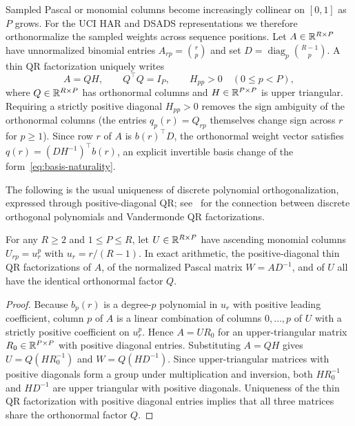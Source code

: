 Sampled Pascal or monomial columns become increasingly collinear on \([0,1]\) as
\(P\) grows. For the UCI HAR and DSADS representations we therefore orthonormalize
the sampled weights across sequence positions. Let \(A \in \mathbb{R}^{R \times P}\) have
unnormalized binomial entries \(A_{rp} = \binom{r}{p}\) and set
\(D = \operatorname{diag}_p\binom{R-1}{p}\). A thin QR factorization uniquely
writes
\[
 A = Q H, \qquad Q^\top Q = I_P, \qquad H_{pp} > 0 \quad (0 \leq p < P),
\]
where \(Q \in \mathbb{R}^{R \times P}\) has orthonormal columns and \(H \in \mathbb{R}^{P \times P}\)
is upper triangular. Requiring a strictly positive diagonal \(H_{pp} > 0\)
removes the sign ambiguity of the orthonormal columns (the entries
\(q_p(r) = Q_{rp}\) themselves change sign across \(r\) for \(p \geq 1\)). Since
row \(r\) of \(A\) is \(b(r)^\top D\), the orthonormal weight vector satisfies
\(q(r) = (D H^{-1})^\top b(r)\), an explicit invertible basis change of the
form~\eqref{eq:basis-naturality}.

The following is the usual uniqueness of discrete polynomial orthogonalization,
expressed through positive-diagonal QR; see~\cite{discreteqr} for the connection
between discrete orthogonal polynomials and Vandermonde QR factorizations.
\begin{proposition}
\label{prop:qr-uniqueness}
For any \(R \geq 2\) and \(1 \leq P \leq R\), let \(U \in \mathbb{R}^{R \times P}\) have
ascending monomial columns \(U_{rp} = u_r^p\) with \(u_r = r/(R-1)\). In exact
arithmetic, the positive-diagonal thin QR factorizations of \(A\), of the
normalized Pascal matrix \(W = A D^{-1}\), and of \(U\) all have the identical
orthonormal factor \(Q\).
\end{proposition}
\begin{proof}
Because \(b_p(r)\) is a degree-\(p\) polynomial in \(u_r\) with positive leading
coefficient, column \(p\) of \(A\) is a linear combination of columns
\(0, \ldots, p\) of \(U\) with a strictly positive coefficient on \(u_r^p\).
Hence \(A = U R_0\) for an upper-triangular matrix \(R_0 \in \mathbb{R}^{P \times P}\)
with positive diagonal entries. Substituting \(A = Q H\) gives
\(U = Q (H R_0^{-1})\) and \(W = Q (H D^{-1})\). Since upper-triangular matrices
with positive diagonals form a group under multiplication and inversion, both
\(H R_0^{-1}\) and \(H D^{-1}\) are upper triangular with positive diagonals.
Uniqueness of the thin QR factorization with positive diagonal entries implies
that all three matrices share the orthonormal factor \(Q\).
\end{proof}

